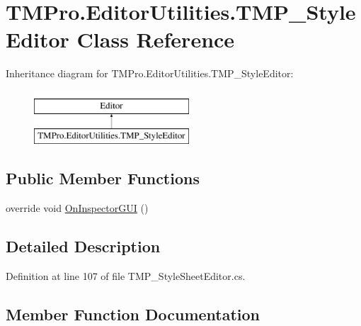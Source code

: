 \hypertarget{class_t_m_pro_1_1_editor_utilities_1_1_t_m_p___style_editor}{}\section{T\+M\+Pro.\+Editor\+Utilities.\+T\+M\+P\+\_\+\+Style\+Editor Class Reference}
\label{class_t_m_pro_1_1_editor_utilities_1_1_t_m_p___style_editor}
Inheritance diagram for T\+M\+Pro.\+Editor\+Utilities.\+T\+M\+P\+\_\+\+Style\+Editor\+:\begin{figure}[H]
\begin{center}
\leavevmode
\includegraphics[height=2.000000cm]{class_t_m_pro_1_1_editor_utilities_1_1_t_m_p___style_editor}
\end{center}
\end{figure}
\subsection*{Public Member Functions}
\begin{DoxyCompactItemize}
\item 
override void \mbox{\hyperlink{class_t_m_pro_1_1_editor_utilities_1_1_t_m_p___style_editor_a05b7055cadf651b230a2bdec1411cebf}{On\+Inspector\+G\+UI}} ()
\end{DoxyCompactItemize}


\subsection{Detailed Description}


Definition at line 107 of file T\+M\+P\+\_\+\+Style\+Sheet\+Editor.\+cs.



\subsection{Member Function Documentation}
\mbox{\label{class_t_m_pro_1_1_editor_utilities_1_1_t_m_p___style_editor_a05b7055cadf651b230a2bdec1411cebf}} 
